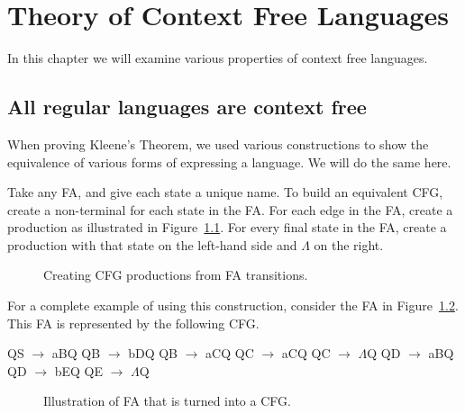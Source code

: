 \documentclass[letterpaper,12pt,openany,reqno]{book}%
\newcommand{\cfgprod}[2] {{\ttfamily #1} $\rightarrow$ {\ttfamily #2}}
\newcommand{\fanonterminalnode}[2] {\node at (#1) (#2) [circle, draw, minimum size=24pt] {#2};}
\newcommand{\fatransition}[3] {\draw [->] (#1) -- (#2) node [midway, above] {#3};}
\newcommand{\farighttransition}[3] {\draw [->] (#1) -- (#2) node [midway, right] {#3};}
\newcommand{\faarctransition}[5] {\draw [->] (#1) to[out=#4, in=#5] node  [midway, above] {#3} (#2) ;}
\newcommand{\faloopright}[2] {\draw (#1) edge [loop right] node {#2} ();}
\begin{document}
\chapter{Theory of Context Free Languages}
In this chapter we will examine various properties of context free languages.
\section{All regular languages are context free}
When proving Kleene's Theorem, we used various constructions to show the equivalence of various forms of expressing a language. We will do the same here.

Take any FA, and give each state a unique name. To build an equivalent CFG, create a non-terminal for each state in the FA. For each edge in the FA, create a production as illustrated in Figure~\ref{F.FA.2.CFG}. For every final state in the FA, create a production with that state on the left-hand side and $\Lambda$ on the right.
\begin{figure}[hbt]
\centering
{}
 \caption{Creating CFG productions from FA transitions.}
  \label{F.FA.2.CFG}
\end{figure}

For a complete example of using this construction, consider the FA in Figure~\ref{F.FA.to.CFG.example}. This FA is represented by the following CFG.
\begin{cfg}{}{}
Q\cfgprod{S}{aB}Q
Q\cfgprod{B}{bD}Q
Q\cfgprod{B}{aC}Q
Q\cfgprod{C}{aC}Q
Q\cfgprod{C}{$\Lambda$}Q
Q\cfgprod{D}{aB}Q
Q\cfgprod{D}{bE}Q
Q\cfgprod{E}{$\Lambda$}Q
\end{cfg}

\begin{figure}[hbt]
\centering
{}
 \caption{Illustration of FA that is turned into a CFG.}
  \label{F.FA.to.CFG.example}
\end{figure}
\end{document}
